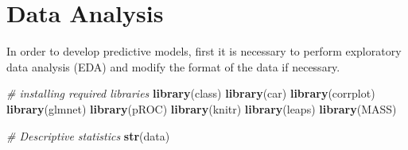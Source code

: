 \documentclass[
  10pt,
  paper=a4,
  ,captions=tableheading
]{scrartcl}
\newenvironment{Shaded}{\begin{snugshade}}{\end{snugshade}}
\newcommand{\CommentTok}[1]{\textcolor[rgb]{0.56,0.35,0.01}{\textit{#1}}}
\newcommand{\FunctionTok}[1]{\textcolor[rgb]{0.13,0.29,0.53}{\textbf{#1}}}
\newcommand{\NormalTok}[1]{#1}
\begin{document}
\section{Data Analysis}\label{data-analysis}

In order to develop predictive models, first it is necessary to perform
exploratory data analysis (EDA) and modify the format of the data if
necessary.

\small

\begin{Shaded}
\begin{Highlighting}[]
\CommentTok{\# installing required libraries}
\FunctionTok{library}\NormalTok{(class)}
\FunctionTok{library}\NormalTok{(car)}
\FunctionTok{library}\NormalTok{(corrplot)}
\FunctionTok{library}\NormalTok{(glmnet)}
\FunctionTok{library}\NormalTok{(pROC)}
\FunctionTok{library}\NormalTok{(knitr)}
\FunctionTok{library}\NormalTok{(leaps)}
\FunctionTok{library}\NormalTok{(MASS)}
\end{Highlighting}
\end{Shaded}

\small

\small

\begin{Shaded}
\begin{Highlighting}[]
\CommentTok{\# Descriptive statistics}
\FunctionTok{str}\NormalTok{(data)}
\end{Highlighting}
\end{Shaded}
\end{document}
